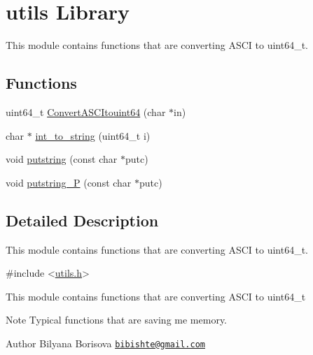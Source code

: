 \hypertarget{group__biba__utils}{\section{utils Library}
\label{group__biba__utils}
}


This module contains functions that are converting A\-S\-C\-I to uint64\-\_\-t.  


\subsection*{Functions}
\begin{DoxyCompactItemize}
\item 
uint64\-\_\-t \hyperlink{group__biba__utils_gade0d11aaaeeeb0b4369bcef0819dd8f9}{Convert\-A\-S\-C\-Itouint64} (char $\ast$in)
\item 
char $\ast$ \hyperlink{group__biba__utils_ga3d33c2ff89043a4bf00d652d182dfc27}{int\-\_\-to\-\_\-string} (uint64\-\_\-t i)
\item 
void \hyperlink{group__biba__utils_ga354be7728c1265a82ba2510f1800cea4}{putstring} (const char $\ast$putc)
\item 
void \hyperlink{group__biba__utils_gaf1b54c4c5b890362b485636395859b3d}{putstring\-\_\-\-P} (const char $\ast$putc)
\end{DoxyCompactItemize}


\subsection{Detailed Description}
This module contains functions that are converting A\-S\-C\-I to uint64\-\_\-t. 
\begin{DoxyCode}
\textcolor{preprocessor}{#include <\hyperlink{utils_8h}{utils.h}>} 
\end{DoxyCode}


This module contains functions that are converting A\-S\-C\-I to uint64\-\_\-t

\begin{DoxyNote}{Note}
Typical functions that are saving me memory. 
\end{DoxyNote}
\begin{DoxyAuthor}{Author}
Bilyana Borisova \href{mailto:bibishte@gmail.com}{\tt bibishte@gmail.\-com} 
\end{DoxyAuthor}


